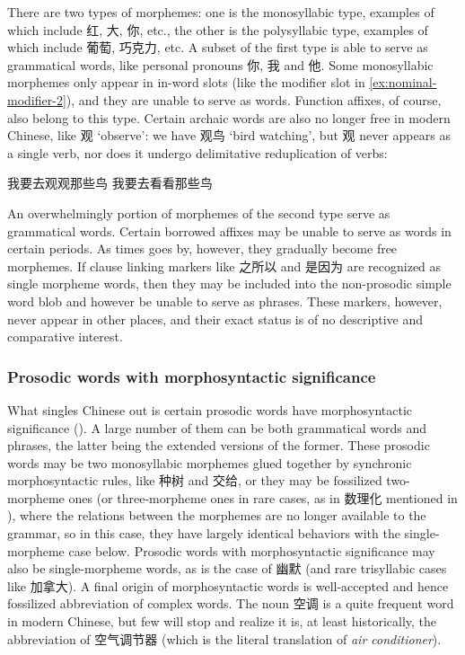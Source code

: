 \documentclass[UTF8, a4paper, oneside, scheme=plain]{ctexrep}
\newcommand{\corpus}[1]{\emph{#1}}
\newcommand{\translate}[1]{`#1'}
\begin{document}
There are two types of morphemes:
one is the monosyllabic type, examples of which include 红, 大, 你, etc.,
the other is the polysyllabic type,
examples of which include 葡萄, 巧克力, etc.
A subset of the first type is able to serve as grammatical words,
like personal pronouns 你, 我 and 他.
Some monosyllabic morphemes only appear in in-word slots 
(like the modifier slot in \eqref{ex:nominal-modifier-2}),
and they are unable to serve as words.
Function affixes, of course, also belong to this type.
Certain archaic words are also no longer free in modern Chinese,
like 观 \translate{observe}:
we have 观鸟 \translate{bird watching},
but 观 never appears as a single verb, 
nor does it undergo delimitative reduplication of verbs:
\begin{exe}
    \ex \begin{xlist}
        \ex *我要去观观那些鸟
        \ex 我要去看看那些鸟
    \end{xlist}
\end{exe}
An overwhelmingly portion of morphemes of the second type serve as grammatical words.
Certain borrowed affixes may be unable to serve as words in certain periods.
As times goes by, however, they gradually become free morphemes.
If clause linking markers like 之所以 and 是因为 are recognized as single morpheme words,
then they may be included into the non-prosodic simple word blob 
and however be unable to serve as phrases.
These markers, however, never appear in other places,
and their exact status is of no descriptive and comparative interest. 

\subsubsection{Prosodic words with morphosyntactic significance}

What singles Chinese out is certain prosodic words have morphosyntactic significance 
().
A large number of them can be both grammatical words and phrases,
the latter being the extended versions of the former.
These prosodic words may be two monosyllabic morphemes glued together by synchronic morphosyntactic rules,
like 种树 and 交给,
or they may be fossilized two-morpheme ones
(or three-morpheme ones in rare cases,
as in 数理化 mentioned in ),
where the relations between the morphemes are no longer available to the grammar,
so in this case,
they have largely identical behaviors with the single-morpheme case below.
Prosodic words with morphosyntactic significance may also be single-morpheme words,
as is the case of 幽默 (and rare trisyllabic cases like 加拿大).
A final origin of morphosyntactic words 
is well-accepted and hence fossilized abbreviation of complex words.
The noun 空调 is a quite frequent word in modern Chinese,
but few will stop and realize it is, at least historically, 
the abbreviation of 空气调节器 (which is the literal translation of \corpus{air conditioner}).
\end{document}
